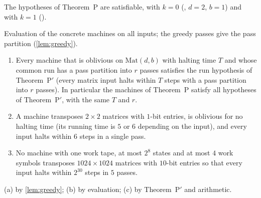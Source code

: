 \begin{proposition}\label{prop:P-witness}
The hypotheses of Theorem~P are satisfiable, with $k=0$ (, $d=2$, $b=1$) and
with $k=1$ ().
\end{proposition}

\begin{outline}
Evaluation of the concrete machines on all inputs; the greedy passes give the pass partition
(\cref{lem:greedy}).
\end{outline}

\begin{proposition}\label{prop:Pprime-witness}
\begin{enumerate}[label=(\alph*)]
\item Every machine that is oblivious on $\mathrm{Mat}(d,b)$ with halting time $T$ and whose common run
has a pass partition into $r$ passes satisfies the run hypothesis of Theorem~P$'$ (every matrix input halts
within $T$ steps with a pass partition into $r$ passes). In particular the machines of Theorem~P satisfy all
hypotheses of Theorem~P$'$, with the same $T$ and $r$.
\item A machine  transposes $2\times2$ matrices with $1$-bit entries, is
oblivious for no halting time (its running time is $5$ or $6$ depending on the input), and every
input halts within $6$ steps in a single pass.
\item No machine with one work tape, at most $2^8$ states and at most $4$ work symbols transposes
$1024\times1024$ matrices with $10$-bit entries so that every input halts within $2^{30}$ steps in
$5$ passes.
\end{enumerate}
\end{proposition}

\begin{outline}
(a) by \cref{lem:greedy}; (b) by evaluation; (c) by Theorem~P$'$ and arithmetic.
\end{outline}
